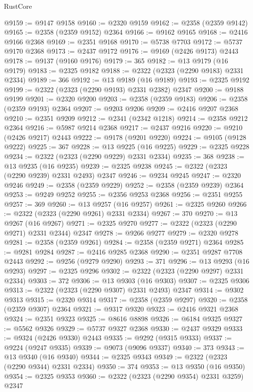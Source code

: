 \begin{lexlean}{RustCore}
\begin{coremodule}
@9159 := @9147 @9158
@9160 := @2320 @9159
@9162 := @2358 (@2359 @9142)
@9165 := @2358 (@2359 @9152) @2364
@9166 := @9162 @9165
@9168 := @2416 @9166 @2368
@9169 := @2351 @9168
@9170 := @5738 @7703
@9172 := @5737 @9170 @2368
@9173 := @2437 @9172
@9176 := @9169 (@2426 @9173) @2443
@9178 := @9137 (@9160 @9176)
@9179 := 365
@9182 := @13 @9179 (@16 @9179)
@9183 := @2325 @9182
@9188 := @2322 (@2323 (@2290 @9183) @2331 @2334)
@9189 := 366
@9192 := @13 @9189 (@16 @9189)
@9193 := @2325 @9192
@9199 := @2322 (@2323 (@2290 @9193) @2331 @2382) @2347
@9200 := @9188 @9199
@9201 := @2320 @9200
@9203 := @2358 (@2359 @9183)
@9206 := @2358 (@2359 @9193) @2364
@9207 := @9203 @9206
@9209 := @2416 @9207 @2368
@9210 := @2351 @9209
@9212 := @2341 (@2342 @1218)
@9214 := @2358 @9212 @2364
@9216 := @5987 @9214 @2368
@9217 := @2437 @9216
@9220 := @9210 (@2426 @9217) @2443
@9222 := @9178 (@9201 @9220)
@9224 := @9105 (@9128 @9222)
@9225 := 367
@9228 := @13 @9225 (@16 @9225)
@9229 := @2325 @9228
@9234 := @2322 (@2323 (@2290 @9229) @2331 @2334)
@9235 := 368
@9238 := @13 @9235 (@16 @9235)
@9239 := @2325 @9238
@9245 := @2322 (@2323 (@2290 @9239) @2331 @2493) @2347
@9246 := @9234 @9245
@9247 := @2320 @9246
@9249 := @2358 (@2359 @9229)
@9252 := @2358 (@2359 @9239) @2364
@9253 := @9249 @9252
@9255 := @2356 @9253 @2368
@9256 := @2351 @9255
@9257 := 369
@9260 := @13 @9257 (@16 @9257)
@9261 := @2325 @9260
@9266 := @2322 (@2323 (@2290 @9261) @2331 @2334)
@9267 := 370
@9270 := @13 @9267 (@16 @9267)
@9271 := @2325 @9270
@9277 := @2322 (@2323 (@2290 @9271) @2331 @2344) @2347
@9278 := @9266 @9277
@9279 := @2320 @9278
@9281 := @2358 (@2359 @9261)
@9284 := @2358 (@2359 @9271) @2364
@9285 := @9281 @9284
@9287 := @2416 @9285 @2368
@9290 := @2351 @9287 @7708 @2443
@9292 := @9256 (@9279 @9290)
@9293 := 371
@9296 := @13 @9293 (@16 @9293)
@9297 := @2325 @9296
@9302 := @2322 (@2323 (@2290 @9297) @2331 @2334)
@9303 := 372
@9306 := @13 @9303 (@16 @9303)
@9307 := @2325 @9306
@9313 := @2322 (@2323 (@2290 @9307) @2331 @2493) @2347
@9314 := @9302 @9313
@9315 := @2320 @9314
@9317 := @2358 (@2359 @9297)
@9320 := @2358 (@2359 @9307) @2364
@9321 := @9317 @9320
@9323 := @2416 @9321 @2368
@9324 := @2351 @9323
@9325 := @8616 @8898
@9326 := @6184 @9325
@9327 := @5562 @9326
@9329 := @5737 @9327 @2368
@9330 := @2437 @9329
@9333 := @9324 (@2426 @9330) @2443
@9335 := @9292 (@9315 @9333)
@9337 := @9224 (@9247 @9335)
@9339 := @9073 (@9096 @9337)
@9340 := 373
@9343 := @13 @9340 (@16 @9340)
@9344 := @2325 @9343
@9349 := @2322 (@2323 (@2290 @9344) @2331 @2334)
@9350 := 374
@9353 := @13 @9350 (@16 @9350)
@9354 := @2325 @9353
@9360 := @2322 (@2323 (@2290 @9354) @2331 @3259) @2347

\end{coremodule}
\end{lexlean}
